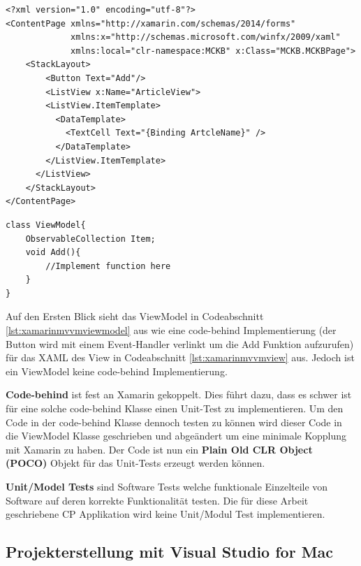 	\begin{lstlisting}[caption={Beispiel View},label={lst:xamarinmvvmview},captionpos=b,style=JAVA-Own]
<?xml version="1.0" encoding="utf-8"?>
<ContentPage xmlns="http://xamarin.com/schemas/2014/forms"
             xmlns:x="http://schemas.microsoft.com/winfx/2009/xaml"
             xmlns:local="clr-namespace:MCKB" x:Class="MCKB.MCKBPage">
    <StackLayout>
        <Button Text="Add"/>
        <ListView x:Name="ArticleView">
        <ListView.ItemTemplate>
          <DataTemplate>
            <TextCell Text="{Binding ArtcleName}" />
          </DataTemplate>
        </ListView.ItemTemplate>
      </ListView>
    </StackLayout>
</ContentPage>
	\end{lstlisting}

	\begin{lstlisting}[caption={Beispiel ViewModel für Codeabschnitt \ref{lst:xamarinmvvmview} (View)},label={lst:xamarinmvvmviewmodel},captionpos=b,style=csharp]
class ViewModel{
	ObservableCollection Item;
	void Add(){
		//Implement function here
	}
}
	\end{lstlisting}

	Auf den Ersten Blick sieht das ViewModel in Codeabschnitt \ref{lst:xamarinmvvmviewmodel} aus wie eine code-behind Implementierung (der Button wird mit einem Event-Handler verlinkt um die Add Funktion aufzurufen) für das XAML des View in Codeabschnitt \ref{lst:xamarinmvvmview} aus. Jedoch ist ein ViewModel keine code-behind Implementierung.

	\textbf{Code-behind} ist fest an Xamarin gekoppelt. Dies führt dazu, dass es schwer ist für eine solche code-behind Klasse einen Unit-Test zu implementieren. Um den Code in der code-behind Klasse dennoch testen zu können wird dieser Code in die ViewModel Klasse geschrieben und abgeändert um eine minimale Kopplung mit Xamarin zu haben. Der Code ist nun ein \textbf{Plain Old CLR Object (POCO)} Objekt für das Unit-Tests erzeugt werden können.

	\textbf{Unit/Model Tests} sind Software Tests welche funktionale Einzelteile von Software auf deren korrekte Funktionalität testen. Die für diese Arbeit geschriebene CP Applikation wird keine Unit/Modul Test implementieren.

\newpage
\subsection{Projekterstellung mit Visual Studio for Mac}
\label{sec:xamarincreateproject}

